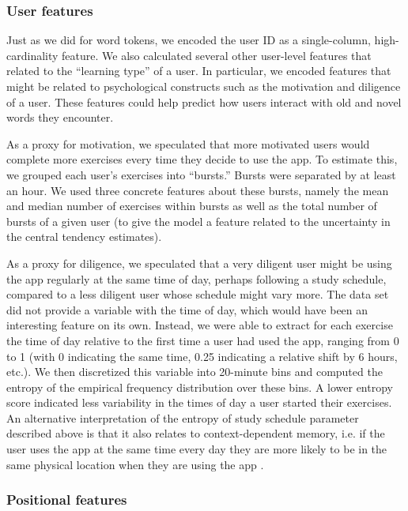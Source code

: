 \documentclass[11pt,a4paper]{article}
\begin{document}
\subsubsection{User features}

Just as we did for word tokens, we encoded the user ID as a single-column,
high-cardinality feature. We also calculated several other user-level features that related to the ``learning type'' of a user. In particular, we encoded features that might be related to psychological constructs such as the motivation and diligence of a user. These features could help predict how users interact with old and novel words they encounter.

As a proxy for motivation, we speculated that more motivated users would complete more exercises every time they decide to use the app. To estimate this, we grouped each user's exercises into ``bursts.'' Bursts were separated by at least an hour.  We used three
concrete features about these bursts, namely the mean and median number of
exercises within bursts as well as the total number of bursts of a given user (to give the model a feature related to the uncertainty in the central tendency estimates).

As a proxy for diligence, we speculated that a very diligent user might be using the app regularly at the same time of day, perhaps following a study schedule, compared to a less diligent user whose schedule might vary more. The data set did not provide a variable with the time of day, which would have been an interesting feature on its own. Instead, we were able to extract for each exercise the time of day relative to the first time a user had used the app, ranging from 0 to 1 (with 0 indicating the same time, 0.25 indicating a relative shift by 6 hours, etc.).  We then discretized this variable into 20-minute bins and computed the entropy of the empirical frequency distribution over these bins. A lower entropy score indicated less variability in the times of day a user started their exercises. An alternative interpretation of the entropy of study schedule parameter described above is that it also relates to context-dependent memory, i.e. if the user uses the app at the same time every day they are more likely to be in the same physical location when they are using the app \cite{godden1975context}.

\subsubsection{Positional features}
\end{document}
